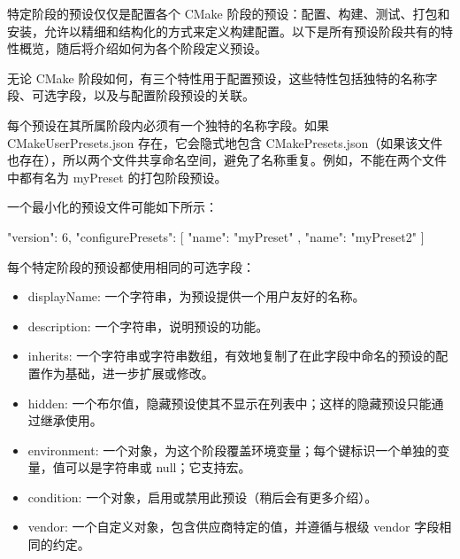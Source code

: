 

特定阶段的预设仅仅是配置各个 CMake 阶段的预设：配置、构建、测试、打包和安装，允许以精细和结构化的方式来定义构建配置。以下是所有预设阶段共有的特性概览，随后将介绍如何为各个阶段定义预设。


无论 CMake 阶段如何，有三个特性用于配置预设，这些特性包括独特的名称字段、可选字段，以及与配置阶段预设的关联。


每个预设在其所属阶段内必须有一个独特的名称字段。如果 CMakeUserPresets.json 存在，它会隐式地包含 CMakePresets.json（如果该文件也存在），所以两个文件共享命名空间，避免了名称重复。例如，不能在两个文件中都有名为 myPreset 的打包阶段预设。

一个最小化的预设文件可能如下所示：

\begin{json}
{
    "version": 6,
    "configurePresets": [
    {
        "name": "myPreset"
    },
    {
        "name": "myPreset2"
    }
    ]
}
\end{json}


每个特定阶段的预设都使用相同的可选字段：

\begin{itemize}
\item
displayName: 一个字符串，为预设提供一个用户友好的名称。

\item
description: 一个字符串，说明预设的功能。

\item
inherits: 一个字符串或字符串数组，有效地复制了在此字段中命名的预设的配置作为基础，进一步扩展或修改。

\item
hidden: 一个布尔值，隐藏预设使其不显示在列表中；这样的隐藏预设只能通过继承使用。

\item
environment: 一个对象，为这个阶段覆盖环境变量；每个键标识一个单独的变量，值可以是字符串或 null；它支持宏。

\item
condition: 一个对象，启用或禁用此预设（稍后会有更多介绍）。

\item
vendor: 一个自定义对象，包含供应商特定的值，并遵循与根级 vendor 字段相同的约定。
\end{itemize}

